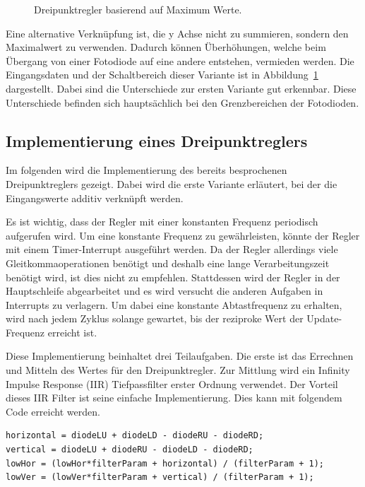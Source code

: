 \begin{figure} \centering
	
	\caption{Dreipunktregler basierend auf Maximum Werte.}
	\label{img:dreipunktreglerMax}
\end{figure}

Eine alternative Verknüpfung ist, die y Achse nicht zu summieren, sondern den Maximalwert zu verwenden.
Dadurch können Überhöhungen, welche beim Übergang von einer Fotodiode auf eine andere entstehen, vermieden werden.
Die Eingangsdaten und der Schaltbereich dieser Variante ist in Abbildung~\ref{img:dreipunktreglerMax} dargestellt.
Dabei sind die Unterschiede zur ersten Variante gut erkennbar.
Diese Unterschiede befinden sich hauptsächlich bei den Grenzbereichen der Fotodioden.


\subsection{Implementierung eines Dreipunktreglers}
Im folgenden wird die Implementierung des bereits besprochenen Dreipunktreglers gezeigt.
Dabei wird die erste Variante erläutert, bei der die Eingangswerte additiv verknüpft werden.

Es ist wichtig, dass der Regler mit einer konstanten Frequenz periodisch aufgerufen wird.
Um eine konstante Frequenz zu gewährleisten, könnte der Regler mit einem Timer-Interrupt ausgeführt werden.
Da der Regler allerdings viele Gleitkommaoperationen benötigt und deshalb eine lange Verarbeitungszeit benötigt wird, ist dies nicht zu empfehlen.
Stattdessen wird der Regler in der Hauptschleife abgearbeitet und es wird versucht die anderen Aufgaben in Interrupts zu verlagern.
Um dabei eine konstante Abtastfrequenz zu erhalten, wird nach jedem Zyklus solange gewartet, bis der reziproke Wert der Update-Frequenz erreicht ist.

Diese Implementierung beinhaltet drei Teilaufgaben.
Die erste ist das Errechnen und Mitteln des Wertes für den Dreipunktregler.
Zur Mittlung wird ein Infinity Impulse Response (IIR) Tiefpassfilter erster Ordnung verwendet.
Der Vorteil dieses IIR Filter ist seine einfache Implementierung.
Dies kann mit folgendem Code erreicht werden.

\begin{minipage}{\textwidth}
\begin{lstlisting}
horizontal = diodeLU + diodeLD - diodeRU - diodeRD;
vertical = diodeLU + diodeRU - diodeLD - diodeRD;
lowHor = (lowHor*filterParam + horizontal) / (filterParam + 1);
lowVer = (lowVer*filterParam + vertical) / (filterParam + 1);
\end{lstlisting}
\end{minipage}

